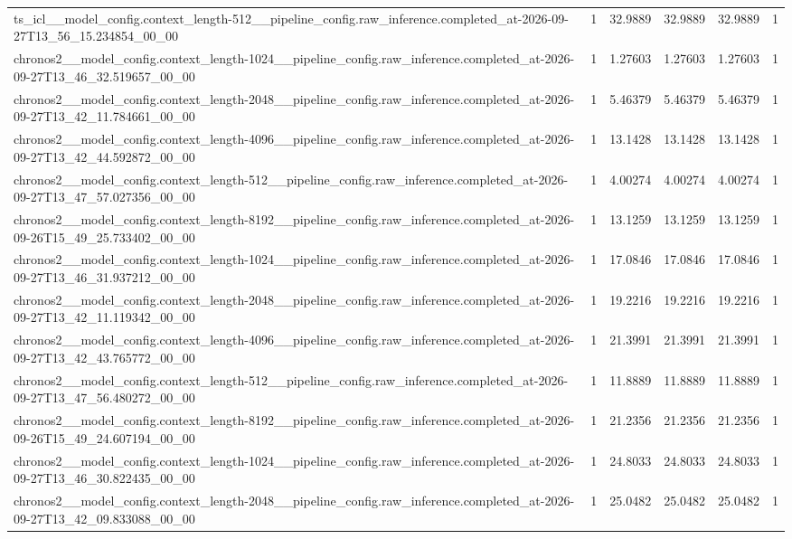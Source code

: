\begin{tabular}{llllll}
ts\_icl\_\_model\_config.context\_length-512\_\_pipeline\_config.raw\_inference.completed\_at-2026-09-27T13\_56\_15.234854\_00\_00 & 1 & 32.9889 & 32.9889 & 32.9889 & 1 \\
chronos2\_\_model\_config.context\_length-1024\_\_pipeline\_config.raw\_inference.completed\_at-2026-09-27T13\_46\_32.519657\_00\_00 & 1 & 1.27603 & 1.27603 & 1.27603 & 1 \\
chronos2\_\_model\_config.context\_length-2048\_\_pipeline\_config.raw\_inference.completed\_at-2026-09-27T13\_42\_11.784661\_00\_00 & 1 & 5.46379 & 5.46379 & 5.46379 & 1 \\
chronos2\_\_model\_config.context\_length-4096\_\_pipeline\_config.raw\_inference.completed\_at-2026-09-27T13\_42\_44.592872\_00\_00 & 1 & 13.1428 & 13.1428 & 13.1428 & 1 \\
chronos2\_\_model\_config.context\_length-512\_\_pipeline\_config.raw\_inference.completed\_at-2026-09-27T13\_47\_57.027356\_00\_00 & 1 & 4.00274 & 4.00274 & 4.00274 & 1 \\
chronos2\_\_model\_config.context\_length-8192\_\_pipeline\_config.raw\_inference.completed\_at-2026-09-26T15\_49\_25.733402\_00\_00 & 1 & 13.1259 & 13.1259 & 13.1259 & 1 \\
chronos2\_\_model\_config.context\_length-1024\_\_pipeline\_config.raw\_inference.completed\_at-2026-09-27T13\_46\_31.937212\_00\_00 & 1 & 17.0846 & 17.0846 & 17.0846 & 1 \\
chronos2\_\_model\_config.context\_length-2048\_\_pipeline\_config.raw\_inference.completed\_at-2026-09-27T13\_42\_11.119342\_00\_00 & 1 & 19.2216 & 19.2216 & 19.2216 & 1 \\
chronos2\_\_model\_config.context\_length-4096\_\_pipeline\_config.raw\_inference.completed\_at-2026-09-27T13\_42\_43.765772\_00\_00 & 1 & 21.3991 & 21.3991 & 21.3991 & 1 \\
chronos2\_\_model\_config.context\_length-512\_\_pipeline\_config.raw\_inference.completed\_at-2026-09-27T13\_47\_56.480272\_00\_00 & 1 & 11.8889 & 11.8889 & 11.8889 & 1 \\
chronos2\_\_model\_config.context\_length-8192\_\_pipeline\_config.raw\_inference.completed\_at-2026-09-26T15\_49\_24.607194\_00\_00 & 1 & 21.2356 & 21.2356 & 21.2356 & 1 \\
chronos2\_\_model\_config.context\_length-1024\_\_pipeline\_config.raw\_inference.completed\_at-2026-09-27T13\_46\_30.822435\_00\_00 & 1 & 24.8033 & 24.8033 & 24.8033 & 1 \\
chronos2\_\_model\_config.context\_length-2048\_\_pipeline\_config.raw\_inference.completed\_at-2026-09-27T13\_42\_09.833088\_00\_00 & 1 & 25.0482 & 25.0482 & 25.0482 & 1 \\

\end{tabular}
